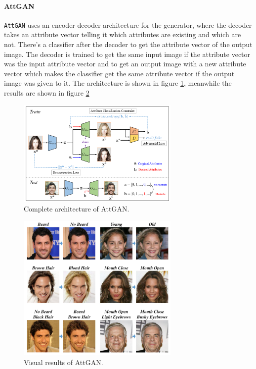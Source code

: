 \paragraph{AttGAN}
\texttt{AttGAN} \cite{he2018attgan} uses an encoder-decoder architecture for the generator, where the decoder takes an attribute vector telling it which attributes are existing and which are not. There’s a classifier after the decoder to get the attribute vector of the output image. The decoder is trained to get the same input image if the attribute vector was the input attribute vector and to get an output image with a new attribute vector which makes the classifier get the same attribute vector if the output image was given to it. The architecture is shown in figure \ref{fig:attgan}, meanwhile the results are shown in figure \ref{fig:attgan_res}

\begin{figure}[H]
    \centering
    \includegraphics[width=0.7\textwidth]{images/attgan.png}
    \caption{Complete architecture of AttGAN.}
    \label{fig:attgan}
\end{figure}

\begin{figure}[H]
    \centering
    \includegraphics[width=0.7\textwidth]{images/attgan-results.png}
    \caption{Visual results of AttGAN.}
    \label{fig:attgan_res}
\end{figure}


